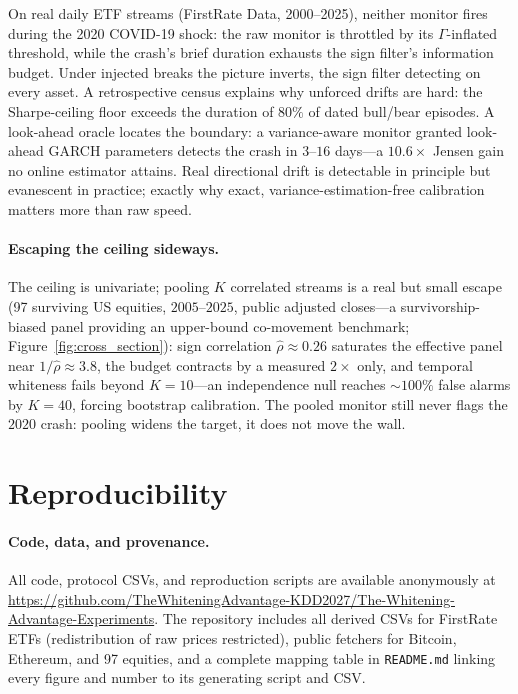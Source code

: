 \documentclass[sigconf,anonymous,review]{acmart}
\theoremstyle{acmdefinition}
\begin{document}
On real daily ETF streams (FirstRate Data, 2000--2025), neither monitor fires during the 2020 COVID-19 shock: the raw monitor is throttled by its $\Gamma$-inflated threshold, while the crash's brief duration exhausts the sign filter's information budget. Under injected breaks the picture inverts, the sign filter detecting on every asset. A retrospective census explains why unforced drifts are hard: the Sharpe-ceiling floor exceeds the duration of $80\%$ of dated bull/bear episodes. A look-ahead oracle locates the boundary: a variance-aware monitor granted look-ahead GARCH parameters detects the crash in $3$--$16$ days---a $10.6\times$ Jensen gain no online estimator attains. Real directional drift is detectable in principle but evanescent in practice; exactly why exact, variance-estimation-free calibration matters more than raw speed.

\paragraph{Escaping the ceiling sideways.} The ceiling is univariate; pooling $K$ correlated streams is a real but small escape (97 surviving US equities, $2005$--$2025$, public adjusted closes---a survivorship-biased panel providing an upper-bound co-movement benchmark; Figure~\ref{fig:cross_section}): sign correlation $\hat\rho \approx 0.26$ saturates the effective panel near $1/\hat\rho \approx 3.8$, the budget contracts by a measured $2\times$ only, and temporal whiteness fails beyond $K = 10$---an independence null reaches ${\sim}100\%$ false alarms by $K = 40$, forcing bootstrap calibration. The pooled monitor still never flags the $2020$ crash: pooling widens the target, it does not move the wall.

\newpage




\appendix

\section{Reproducibility}\label{app:repro}

\paragraph{Code, data, and provenance.}
All code, protocol CSVs, and reproduction scripts are available anonymously at \url{https://github.com/TheWhiteningAdvantage-KDD2027/The-Whitening-Advantage-Experiments}. The repository includes all derived CSVs for FirstRate ETFs (redistribution of raw prices restricted), public fetchers for Bitcoin, Ethereum, and 97 equities, and a complete mapping table in \texttt{README.md} linking every figure and number to its generating script and CSV.
\end{document}
